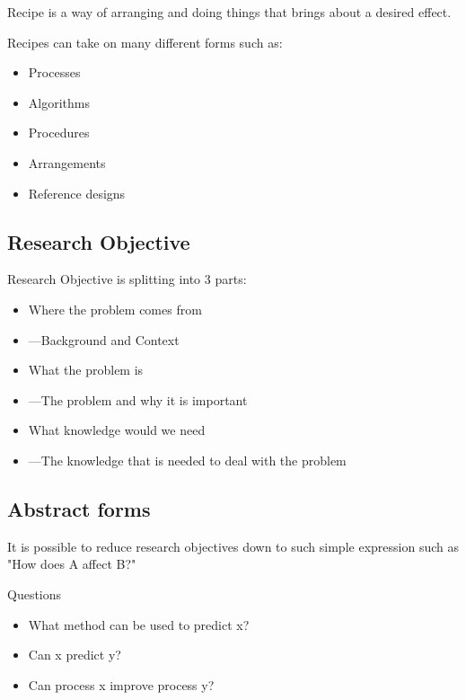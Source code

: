 \documentclass{article}
\begin{document}
Recipe is a way of arranging and doing things that brings about a desired effect.

Recipes can take on many different forms such as:
\begin{itemize}
\item{Processes}
\item{Algorithms}
\item{Procedures}
\item{Arrangements}
\item{Reference designs}
\end{itemize}

\subsection{Research Objective}
Research Objective is splitting into 3 parts:
\begin{itemize}
\item{Where the problem comes from}
\item{---Background and Context}
\item{What the problem is}
\item{---The problem and why it is important}
\item{What knowledge would we need}
\item{---The knowledge that is needed to deal with the problem}
\end{itemize} 

\subsection{Abstract forms}
It is possible to reduce research objectives down to such simple expression such as "How does A affect B?"

Questions
\begin{itemize}
\item{What method can be used to predict x?}
\item{Can x predict y?}
\item{Can process x improve process y?}
\end{itemize}



 
\end{document}
